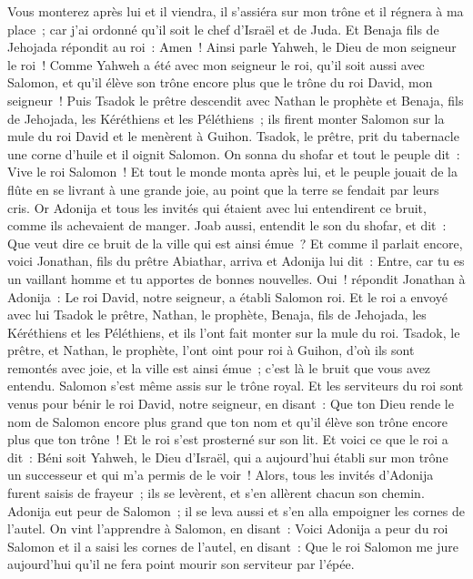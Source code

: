 \begin{multicols}{2}
Vous monterez après lui et il viendra, il s'assiéra sur mon trône et il régnera à ma place~; car j'ai ordonné qu'il soit le chef d'Israël et de Juda.
Et Benaja fils de Jehojada répondit au roi~: Amen~! Ainsi parle Yahweh, le Dieu de mon seigneur le roi~!
Comme Yahweh a été avec mon seigneur le roi, qu'il soit aussi avec Salomon, et qu'il élève son trône encore plus que le trône du roi David, mon seigneur~!
Puis Tsadok le prêtre descendit avec Nathan le prophète et Benaja, fils de Jehojada, les Kéréthiens et les Péléthiens~; ils firent monter Salomon sur la mule du roi David et le menèrent à Guihon.
Tsadok, le prêtre, prit du tabernacle une corne d'huile et il oignit Salomon. On sonna du shofar et tout le peuple dit~: Vive le roi Salomon~!
Et tout le monde monta après lui, et le peuple jouait de la flûte en se livrant à une grande joie, au point que la terre se fendait par leurs cris.
Or Adonija et tous les invités qui étaient avec lui entendirent ce bruit, comme ils achevaient de manger. Joab aussi, entendit le son du shofar, et dit~: Que veut dire ce bruit de la ville qui est ainsi émue~?
Et comme il parlait encore, voici Jonathan, fils du prêtre Abiathar, arriva et Adonija lui dit~: Entre, car tu es un vaillant homme et tu apportes de bonnes nouvelles.
Oui~! répondit Jonathan à Adonija~: Le roi David, notre seigneur, a établi Salomon roi.
Et le roi a envoyé avec lui Tsadok le prêtre, Nathan, le prophète, Benaja, fils de Jehojada, les Kéréthiens et les Péléthiens, et ils l'ont fait monter sur la mule du roi.
Tsadok, le prêtre, et Nathan, le prophète, l'ont oint pour roi à Guihon, d'où ils sont remontés avec joie, et la ville est ainsi émue~; c'est là le bruit que vous avez entendu.
Salomon s'est même assis sur le trône royal.
Et les serviteurs du roi sont venus pour bénir le roi David, notre seigneur, en disant~: Que ton Dieu rende le nom de Salomon encore plus grand que ton nom et qu'il élève son trône encore plus que ton trône~! Et le roi s'est prosterné sur son lit.
Et voici ce que le roi a dit~: Béni soit Yahweh, le Dieu d'Israël, qui a aujourd'hui établi sur mon trône un successeur et qui m'a permis de le voir~!
Alors, tous les invités d'Adonija furent saisis de frayeur~; ils se levèrent, et s'en allèrent chacun son chemin.
Adonija eut peur de Salomon~; il se leva aussi et s'en alla empoigner les cornes de l'autel.
On vint l'apprendre à Salomon, en disant~: Voici Adonija a peur du roi Salomon et il a saisi les cornes de l'autel, en disant~: Que le roi Salomon me jure aujourd'hui qu'il ne fera point mourir son serviteur par l'épée.

\end{multicols}
